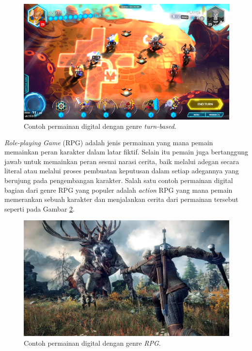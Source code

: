 \begin{figure} [!h] \centering
	\includegraphics[scale=0.39]{img/duelyst.png}
	\caption{Contoh permainan digital dengan genre \textit{turn-based}.}
	\label{fig:turn_based}
\end{figure}

\textit{Role-playing Game} (RPG) \citep{Panumate2015} adalah jenis permainan yang mana pemain memainkan peran karakter dalam latar fiktif. Selain itu pemain juga bertanggung jawab untuk memainkan peran sesuai narasi cerita, baik melalui adegan secara literal atau melalui proses pembuatan keputusan dalam setiap adegannya yang berujung pada pengembangan karakter. Salah satu contoh permainan digital bagian dari genre RPG yang populer adalah \textit{action} RPG yang mana pemain memerankan sebuah karakter dan menjalankan cerita dari permainan tersebut seperti pada Gambar \ref{fig:action_rpg}.
\vspace{1ex}

\begin{figure} [!h] \centering
	\includegraphics[scale=0.18]{img/whitcher.jpg}
	\caption{Contoh permainan digital dengan genre \textit{RPG}.}
	\label{fig:action_rpg}
\end{figure}

